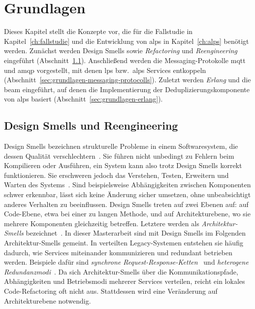 \chapter{Grundlagen}
\label{ch:grundlagen}

Dieses Kapitel stellt die Konzepte vor, die für die Fallstudie in Kapitel~\ref{ch:fallstudie} und die Entwicklung von \gls{alps} in Kapitel~\ref{ch:alps} benötigt werden. Zunächst werden Design Smells sowie \textit{Refactoring} und \textit{Reengineering} eingeführt (Abschnitt~\ref{sec:grundlagen-design-smells}). Anschließend werden die Messaging-Protokolle \gls{mqtt} und \gls{amqp} vorgestellt, mit denen \gls{lps} bzw.~\gls{alps} Services entkoppeln (Abschnitt~\ref{sec:grundlagen-messaging-protocolls}). Zuletzt werden \textit{Erlang} und die \gls{beam} eingeführt, auf denen die Implementierung der Deduplizierungskomponente von \gls{alps} basiert (Abschnitt~\ref{sec:grundlagen-erlang}).

\section{Design Smells und Reengineering}
\label{sec:grundlagen-design-smells}
\label{sec:grundlagen-reengineering-refactoring}

Design Smells bezeichnen strukturelle Probleme in einem Softwaresystem, die dessen Qualität verschlechtern~\citep{software_design_smell_detection}. Sie führen nicht unbedingt zu Fehlern beim Kompilieren oder Ausführen, ein System kann also trotz Design Smells korrekt funktionieren. Sie erschweren jedoch das Verstehen, Testen, Erweitern und Warten des Systems~\citep{software_design_smell_detection}. Sind beispielsweise Abhängigkeiten zwischen Komponenten schwer erkennbar, lässt sich keine Änderung sicher umsetzen, ohne unbeabsichtigt anderes Verhalten zu beeinflussen. Design Smells treten auf zwei Ebenen auf: auf Code-Ebene, etwa bei einer zu langen Methode, und auf Architekturebene, wo sie mehrere Komponenten gleichzeitig betreffen. Letztere werden als \textit{Architektur-Smells} bezeichnet~\citep{refactoring_for_software_architecture_smells}. In dieser Masterarbeit sind mit Design Smells im Folgenden Architektur-Smells gemeint. In verteilten Legacy-Systemen entstehen sie häufig dadurch, wie Services miteinander kommunizieren und redundant betrieben werden. Beispiele dafür sind \textit{synchrone Request-Response-Ketten}~\citep{tiwari_unveiling_2024, liebig_2025_architectural_refactoring} und \textit{heterogene Redundanzmodi}~\citep{choudhary_rajesh_high_2025, liebig_2025_architectural_refactoring}. Da sich Architektur-Smells über die Kommunikationspfade, Abhängigkeiten und Betriebsmodi mehrerer Services verteilen, reicht ein lokales Code-Refactoring oft nicht aus. Stattdessen wird eine Veränderung auf Architekturebene notwendig.

